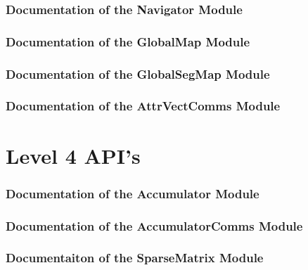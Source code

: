 \documentclass{article}
\begin{document}
\section{Documentation of the Navigator Module}

\section{Documentation of the GlobalMap Module}

\section{Documentation of the GlobalSegMap Module}

\section{Documentation of the AttrVectComms Module}

\part{Level 4 API's}
\section{Documentation of the Accumulator Module}

\section{Documentation of the AccumulatorComms Module}

\section{Documentaiton of the SparseMatrix Module}



 
%
\end{document}
